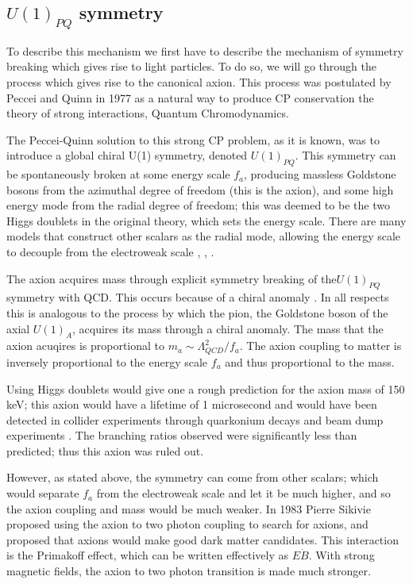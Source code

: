\documentclass[12pt, twosides]{book}
\begin{document}
\subsection{$U(1)_{PQ}$ symmetry}

To describe this mechanism we first have to describe the mechanism of symmetry breaking which gives rise to light particles. To do so, we will go through the process which gives rise to the canonical axion. This process was postulated by Peccei and Quinn in 1977 \cite{peccei77} as a natural way to produce CP conservation the theory of strong interactions, Quantum Chromodynamics. 

The Peccei-Quinn solution to this strong CP problem, as it is known, was to introduce a global chiral U(1) symmetry, denoted $U(1)_{PQ}$. This symmetry can be spontaneously broken at some energy scale $f_a$, producing massless Goldstone bosons from the azimuthal degree of freedom (this is the axion), and some high energy mode from the radial degree of freedom; this was deemed to be the two Higgs doublets in the original theory, which sets the energy scale.  There are many models that construct other scalars as the radial mode, allowing the energy scale to decouple from the electroweak scale \cite{kim79} \cite{shifman80}, \cite{dine81}, \cite{zhitnitsky80}.

The axion acquires mass through explicit symmetry breaking of the$U(1)_{PQ}$ symmetry with QCD. This occurs because of a chiral anomaly \cite{jackiw76}. In all respects this is analogous to the process by which the pion, the Goldstone boson of the axial $U(1)_A$, acquires its mass through a chiral anomaly. The mass that the axion acuqires is proportional to $m_a \sim \Lambda_{QCD}^2/f_a$. The axion coupling to matter is inversely proportional to the energy scale $f_a$ and thus proportional to the mass.

Using Higgs doublets would give one a rough prediction for the axion mass of 150 keV; this axion would have a lifetime of 1 microsecond and would have been detected in collider experiments through quarkonium decays and beam dump experiments \cite{crystalball90}. The branching ratios observed were significantly less than predicted; thus this axion was ruled out.

However, as stated above, the symmetry can come from other scalars; which would separate $f_a$ from the electroweak scale and let it be much higher, and so the axion coupling and mass would be much weaker. In 1983 Pierre Sikivie proposed using the axion to two photon coupling \cite{sikivie83} to search for axions, and proposed that axions would make good dark matter candidates. This interaction is the Primakoff effect, which can be written effectively as $E \dot B$. With strong magnetic fields, the axion to two photon transition is made much stronger.
\end{document}
